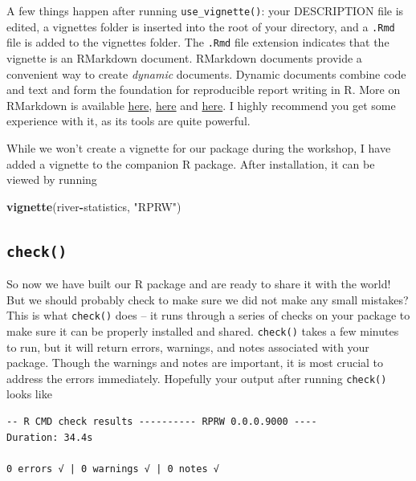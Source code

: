 \documentclass[
]{book}
\newenvironment{Shaded}{\begin{snugshade}}{\end{snugshade}}
\newcommand{\KeywordTok}[1]{\textcolor[rgb]{0.13,0.29,0.53}{\textbf{#1}}}
\newcommand{\NormalTok}[1]{#1}
\newcommand{\OperatorTok}[1]{\textcolor[rgb]{0.81,0.36,0.00}{\textbf{#1}}}
\newcommand{\StringTok}[1]{\textcolor[rgb]{0.31,0.60,0.02}{#1}}
\begin{document}
A few things happen after running \texttt{use\_vignette()}: your DESCRIPTION file is edited, a vignettes folder is inserted into the root of your directory, and a \texttt{.Rmd} file is added to the vignettes folder. The \texttt{.Rmd} file extension indicates that the vignette is an RMarkdown document. RMarkdown documents provide a convenient way to create \emph{dynamic} documents. Dynamic documents combine code and text and form the foundation for reproducible report writing in R. More on RMarkdown is available \href{https://rmarkdown.rstudio.com/}{here}, \href{https://bookdown.org/yihui/rmarkdown/}{here} and \href{https://bookdown.org/yihui/rmarkdown-cookbook/}{here}. I highly recommend you get some experience with it, as its tools are quite powerful.

While we won't create a vignette for our package during the workshop, I have added a vignette to the companion R package. After installation, it can be viewed by running

\begin{Shaded}
\begin{Highlighting}[]
\KeywordTok{vignette}\NormalTok{(river}\OperatorTok{-}\NormalTok{statistics, }\StringTok{"RPRW"}\NormalTok{)}
\end{Highlighting}
\end{Shaded}

\hypertarget{check}{%
\subsection{\texorpdfstring{\texttt{check()}}{check()}}\label{check}}

So now we have built our R package and are ready to share it with the world! But we should probably check to make sure we did not make any small mistakes? This is what \texttt{check()} does -- it runs through a series of checks on your package to make sure it can be properly installed and shared. \texttt{check()} takes a few minutes to run, but it will return errors, warnings, and notes associated with your package. Though the warnings and notes are important, it is most crucial to address the errors immediately.
Hopefully your output after running \texttt{check()} looks like

\begin{verbatim}
-- R CMD check results ---------- RPRW 0.0.0.9000 ----
Duration: 34.4s

0 errors √ | 0 warnings √ | 0 notes √
\end{verbatim}
\end{document}
